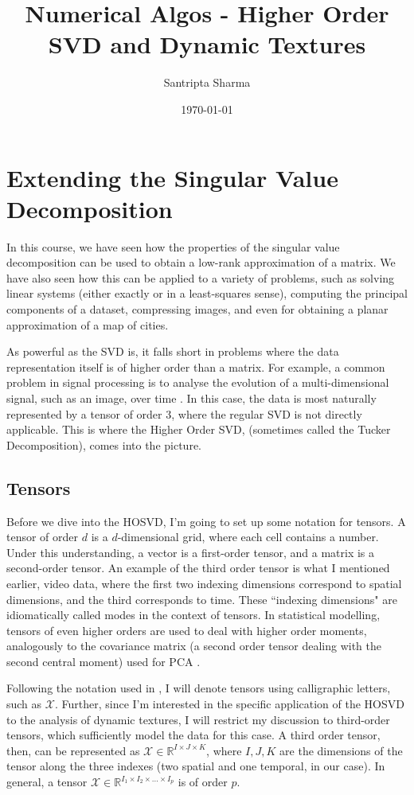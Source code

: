 \documentclass{article}
\title{Numerical Algos - Higher Order SVD and Dynamic Textures}
\author{Santripta Sharma}
\date{\today}
\begin{document}
\maketitle

\section{Extending the Singular Value Decomposition}
In this course, we have seen how the properties of the singular value decomposition can be used to obtain a low-rank approximation of a matrix. We have also seen how this can be applied to a variety of problems, such as solving linear systems (either exactly or in a least-squares sense), computing the principal components of a dataset, compressing images, and even for obtaining a planar approximation of a map of cities.\bigskip

As powerful as the SVD is, it falls short in problems where the data representation itself is of higher order than a matrix. For example, a common problem in signal processing is to analyse the evolution of a multi-dimensional signal, such as an image, over time \cite{HOSVD}. In this case, the data is most naturally represented by a tensor of order 3, where the regular SVD is not directly applicable. This is where the Higher Order SVD, (sometimes called the Tucker Decomposition), comes into the picture.

\subsection{Tensors}
Before we dive into the HOSVD, I'm going to set up some notation for tensors. A tensor of order $d$ is a $d$-dimensional grid, where each cell contains a number. Under this understanding, a vector is a first-order tensor, and a matrix is a second-order tensor. An example of the third order tensor is what I mentioned earlier, video data, where the first two indexing dimensions correspond to spatial dimensions, and the third corresponds to time. These ``indexing dimensions" are idiomatically called modes in the context of tensors. In statistical modelling, tensors of even higher orders are used to deal with higher order moments, analogously to the covariance matrix (a second order tensor dealing with the second central moment) used for PCA \cite{HOSVD}.\bigskip

Following the notation used in \cite{synthesis}, I will denote tensors using calligraphic letters, such as $\mathcal{X}$. Further, since I'm interested in the specific application of the HOSVD to the analysis of dynamic textures, I will restrict my discussion to third-order tensors, which sufficiently model the data for this case. A third order tensor, then, can be represented as $\mathcal{X} \in \mathbb{R}^{I \times J \times K}$, where $I, J, K$ are the dimensions of the tensor along the three indexes (two spatial and one temporal, in our case). In general, a tensor $\mathcal{X} \in \mathbb{R}^{I_1\times I_2\times \dots \times I_p}$ is of order $p$.
\end{document}
